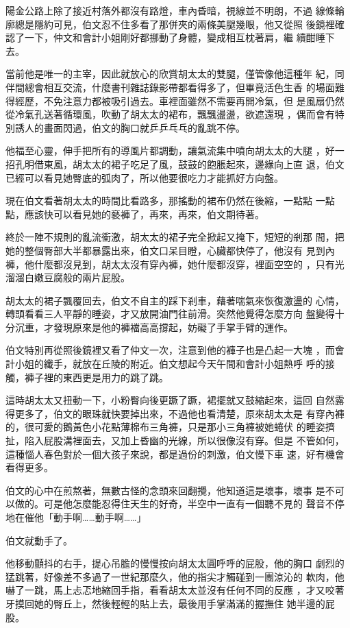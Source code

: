 陽金公路上除了接近村落外都沒有路燈，車內昏暗，視線並不明朗，不過
線條輪廓總是隱約可見，伯文忍不住多看了那併夾的兩條美腿幾眼，他又從照
後鏡裡確認了一下，仲文和會計小姐剛好都挪動了身體，變成相互枕著肩，繼
續酣睡下去。

當前他是唯一的主宰，因此就放心的欣賞胡太太的雙腿，僅管像他這種年
紀，同伴間總會相互交流，什麼書刊雜誌錄影帶都看得多了，但畢竟活色生香
的場面難得經歷，不免注意力都被吸引過去。車裡面雖然不需要再開冷氣，但
是風扇仍然從冷氣孔送著循環風，吹動了胡太太的裙布，飄飄盪盪，欲遮還現
，偶而會有特別誘人的畫面閃過，伯文的胸口就乒乒乓乓的亂跳不停。

他福至心靈，伸手把所有的導風片都調動，讓氣流集中噴向胡太太的大腿
，好一招孔明借東風，胡太太的裙子吃足了風，鼓鼓的飽脹起來，邊緣向上直
退，伯文已經可以看見她臀底的弧肉了，所以他要很吃力才能抓好方向盤。

現在伯文看著胡太太的時間比看路多，那搖動的裙布仍然在後縮，一點點
一點點，應該快可以看見她的褻褲了，再來，再來，伯文期待著。

終於一陣不規則的亂流衝激，胡太太的裙子完全掀起又掩下，短短的剎那
間，把她的整個臀部大半都暴露出來，伯文口呆目瞪，心臟都快停了，他沒有
見到內褲，他什麼都沒見到，胡太太沒有穿內褲，她什麼都沒穿，裡面空空的
，只有光溜溜白嫩豆腐般的兩片屁股。

胡太太的裙子飄覆回去，伯文不自主的踩下剎車，藉著喘氣來恢復激盪的
心情，轉頭看看三人平靜的睡姿，才又放開油門往前滑。突然他覺得怎麼方向
盤變得十分沉重，才發現原來是他的褲襠高高撐起，妨礙了手掌手臂的運作。

伯文特別再從照後鏡裡又看了仲文一次，注意到他的褲子也是凸起一大塊
，而會計小姐的纖手，就放在丘陵的附近。伯文想起今天午間和會計小姐熱呼
呼的接觸，褲子裡的東西更是用力的跳了跳。

這時胡太太又扭動一下，小粉臀向後更蹶了蹶，裙擺就又鼓縮起來，這回
自然露得更多了，伯文的眼珠就快要掉出來，不過他也看清楚，原來胡太太是
有穿內褲的，很可愛的鵝黃色小花點薄棉布三角褲，只是那小三角褲被她蜷伏
的睡姿擠扯，陷入屁股溝裡面去，又加上昏幽的光線，所以很像沒有穿。但是
不管如何，這種惱人春色對於一個大孩子來說，都是過份的刺激，伯文慢下車
速，好有機會看得更多。

伯文的心中在煎熬著，無數古怪的念頭來回翻攪，他知道這是壞事，壞事
是不可以做的。可是他怎麼能忍得住天生的好奇，半空中一直有一個聽不見的
聲音不停地在催他「動手啊……動手啊……」

伯文就動手了。

他移動顫抖的右手，提心吊膽的慢慢按向胡太太圓呼呼的屁股，他的胸口
劇烈的猛跳著，好像差不多過了一世紀那麼久，他的指尖才觸碰到一團涼沁的
軟肉，他嚇了一跳，馬上忐忑地縮回手指，看看胡太太並沒有任何不同的反應
，才又咬著牙摸回她的臀丘上，然後輕輕的貼上去，最後用手掌滿滿的握撫住
她半邊的屁股。

